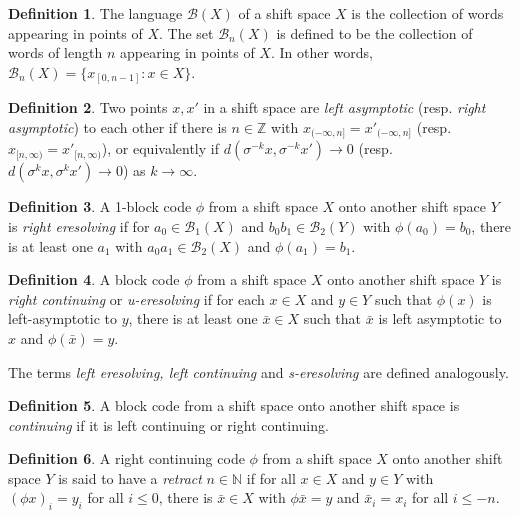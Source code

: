 \documentclass[a4paper]{amsart}
\theoremstyle{definition}
\newtheorem{definition}{Definition}[section]
\numberwithin{equation}{section}
\numberwithin{figure}{section}
\theoremstyle{definition}
\theoremstyle{remark}
\begin{document}
\begin{definition}
  The language ${\mathcal B}(X)$ of a shift space $X$ is the collection of words appearing in points of $X$. The set ${\mathcal B}_n(X)$ is defined to be the collection of words of length $n$ appearing in points of $X$. In other words, ${\mathcal B}_n(X) = \{x_{[0,n-1]} : x \in X\}$.
\end{definition}

\begin{definition}
  Two points $x,x'$ in a shift space are \emph{left asymptotic} (resp. \emph{right asymptotic}) to each other if there is $n\in{\mathbb{Z}}$ with $x_{(-\infty,n]} = x'_{(-\infty,n]}$ (resp. $ x_{[n,\infty)} = x'_{[n,\infty)} $), or equivalently if $d(\sigma^{-k}x, \sigma^{-k}x') \to 0$ (resp. $d(\sigma^kx, \sigma^kx') \to 0$) as $k \to \infty$.
\end{definition}

\begin{definition}
  A 1-block code $\phi$ from a shift space $X$ onto another shift space $Y$ is \emph{right eresolving} if for $a_0 \in {\mathcal B}_1(X)$ and $b_0b_1 \in {\mathcal B}_2(Y)$ with $\phi(a_0) = b_0$, there is at least one $a_1$ with $a_0a_1\in{\mathcal B}_2(X)$ and $\phi(a_1)=b_1$.
\end{definition}

\begin{definition}
  A block code $\phi$ from a shift space $X$ onto another shift space $Y$ is \emph{right continuing} or \emph{u-eresolving} if for each $x \in X$ and $y\in Y$ such that $\phi(x)$ is left-asymptotic to $y$, there is at least one $\bar x \in X$ such that $\bar x$ is left asymptotic to $x$ and $\phi(\bar x)=y$.
\end{definition}

The terms \emph{left eresolving, left continuing} and \emph{s-eresolving} are defined analogously.

\begin{definition}
  A  block code from a shift space onto another shift space is \emph{continuing} if it is left continuing or right continuing.
\end{definition}

\begin{definition}
  A right continuing code $\phi$ from a shift space $X$  onto another shift space $Y$ is said to have a \emph{retract} $n \in {\mathbb{N}}$ if for all $x\in X$ and $y \in Y$
  with $(\phi x)_i = y_i$ for all $i \le 0$, there is $\bar x \in X$
  with $\phi\bar x = y$ and $\bar x_i = x_i$ for all $i \le -n$.
\end{definition}
\end{document}
